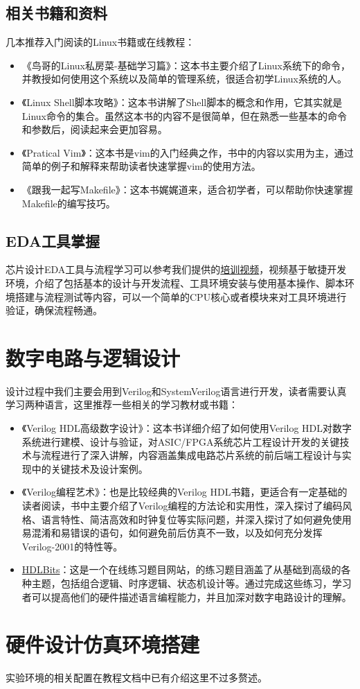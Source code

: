 \subsection{相关书籍和资料}\label{sec:01-hardware-preparation-005}

几本推荐入门阅读的Linux书籍或在线教程：

\begin{itemize}
\tightlist
\item
  《鸟哥的Linux私房菜-基础学习篇》：这本书主要介绍了Linux系统下的命令，并教授如何使用这个系统以及简单的管理系统，很适合初学Linux系统的人。
\item
  《Linux Shell脚本攻略》：这本书讲解了Shell脚本的概念和作用，它其实就是Linux命令的集合。虽然这本书的内容不是很简单，但在熟悉一些基本的命令和参数后，阅读起来会更加容易。
\item
  《Pratical Vim》：这本书是vim的入门经典之作，书中的内容以实用为主，通过简单的例子和解释来帮助读者快速掌握vim的使用方法。
\item
  《跟我一起写Makefile》：这本书娓娓道来，适合初学者，可以帮助你快速掌握Makefile的编写技巧。
\end{itemize}

\subsection{EDA工具掌握}\label{sec:01-hardware-preparation-006}

芯片设计EDA工具与流程学习可以参考我们提供的\href{https://www.bilibili.com/video/BV1gXe8eUEmd}{培训视频}，视频基于敏捷开发环境，介绍了包括基本的设计与开发流程、工具环境安装与使用基本操作、脚本环境搭建与流程测试等内容，可以一个简单的CPU核心或者模块来对工具环境进行验证，确保流程畅通。

\section{数字电路与逻辑设计}\label{sec:01-hardware-preparation-007}

设计过程中我们主要会用到Verilog和SystemVerilog语言进行开发，读者需要认真学习两种语言，这里推荐一些相关的学习教材或书籍：

\begin{itemize}
\item
  《Verilog HDL高级数字设计》：这本书详细介绍了如何使用Verilog HDL对数字系统进行建模、设计与验证，对ASIC/FPGA系统芯片工程设计开发的关键技术与流程进行了深入讲解，内容涵盖集成电路芯片系统的前后端工程设计与实现中的关键技术及设计案例。
\item
  《Verilog编程艺术》：也是比较经典的Verilog HDL书籍，更适合有一定基础的读者阅读，书中主要介绍了Verilog编程的方法论和实用性，深入探讨了编码风格、语言特性、简洁高效和时钟复位等实际问题，并深入探讨了如何避免使用易混淆和易错误的语句，如何避免前后仿真不一致，以及如何充分发挥Verilog-2001的特性等。
\item
  \href{https://hdlbits.01xz.net/wiki/Main_Page}{HDLBits}：这是一个在线练习题目网站，的练习题目涵盖了从基础到高级的各种主题，包括组合逻辑、时序逻辑、状态机设计等。通过完成这些练习，学习者可以提高他们的硬件描述语言编程能力，并且加深对数字电路设计的理解。
\end{itemize}

\section{硬件设计仿真环境搭建}\label{sec:01-hardware-preparation-008}

实验环境的相关配置在教程文档中已有介绍这里不过多赘述。
